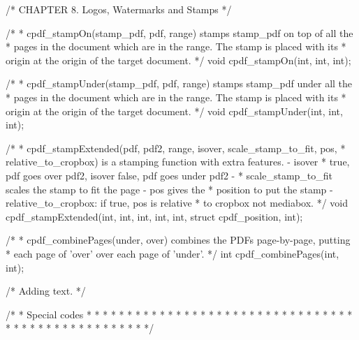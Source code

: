 /* CHAPTER 8. Logos, Watermarks and Stamps */

/*
 * cpdf_stampOn(stamp_pdf, pdf, range) stamps stamp_pdf on top of all the
 * pages in the document which are in the range. The stamp is placed with its
 * origin at the origin of the target document.
 */
void cpdf_stampOn(int, int, int);

/*
 * cpdf_stampUnder(stamp_pdf, pdf, range) stamps stamp_pdf under all the
 * pages in the document which are in the range. The stamp is placed with its
 * origin at the origin of the target document.
 */
void cpdf_stampUnder(int, int, int);

/*
 * cpdf_stampExtended(pdf, pdf2, range, isover, scale_stamp_to_fit, pos,
 * relative_to_cropbox) is a stamping function with extra features. - isover
 * true, pdf goes over pdf2, isover false, pdf goes under pdf2 -
 * scale_stamp_to_fit scales the stamp to fit the page - pos gives the
 * position to put the stamp - relative_to_cropbox: if true, pos is relative
 * to cropbox not mediabox.
 */
void cpdf_stampExtended(int, int, int, int, int, struct cpdf_position, int);

/*
 * cpdf_combinePages(under, over) combines the PDFs page-by-page, putting
 * each page of 'over' over each page of 'under'.
 */
int cpdf_combinePages(int, int);

/* Adding text. */

/*
 * Special codes
 *
 * %
 *
 * %
 *
 * %
 *
 * %
 *
 * %
 *
 * %
 *
 * %
 *
 * %
 *
 * %
 *
 * %
 *
 * %
 *
 * %
 *
 * %
 *
 * %
 *
 * %
 *
 * %
 *
 * %
 *
 * %
 *
 * %
 *
 * %
 *
 * %
 *
 * %
 *
 * %
 *
 * %
 *
 * %
 */

